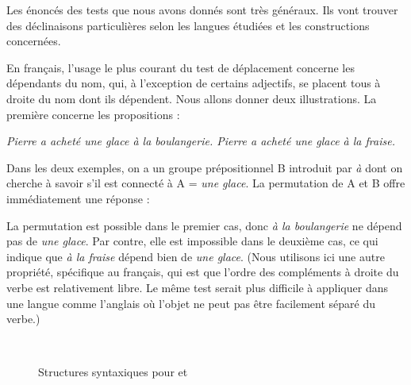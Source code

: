 Les énoncés des tests que nous avons donnés sont très généraux. Ils vont trouver des déclinaisons particulières selon les langues étudiées et les constructions concernées.

En français, l’usage le plus courant du test de déplacement concerne les dépendants du nom, qui, à l’exception de certains adjectifs, se placent tous à droite du nom dont ils dépendent. Nous allons donner deux illustrations. La première concerne les propositions :

\ea
  \ea \itshape Pierre a acheté une glace à la boulangerie.
  \ex \itshape Pierre a acheté une glace à la fraise.
  \z
\z

Dans les deux exemples, on a un groupe prépositionnel B introduit par \textit{à} dont on cherche à savoir s’il est connecté à A = \textit{une glace}. La permutation de A et B offre immédiatement une réponse :

\ea
    \label{ex:boulangerie}
    \label{ex:fraise}
    \z
\z

La permutation est possible dans le premier cas, donc \textit{à la boulangerie} ne dépend pas de \textit{une glace}. Par contre, elle est impossible dans le deuxième cas, ce qui indique que \textit{à la fraise} dépend bien de \textit{une glace}. (Nous utilisons ici une autre propriété, spécifique au français, qui est que l’ordre des compléments à droite du verbe est relativement libre. Le même test serait plus difficile à appliquer dans une langue comme l’anglais où l’objet ne peut pas être facilement séparé du verbe.)

\begin{figure}
\medskip\\
\caption{Structures syntaxiques pour  et }
\end{figure}

